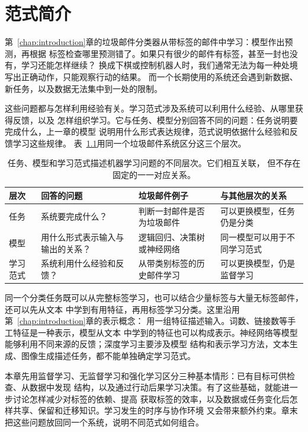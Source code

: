\chapter{范式简介}
\label{chap:machine-learning-paradigms}

第~\ref{chap:introduction}章的垃圾邮件分类器从带标签的邮件中学习：模型作出预测，再根据
标签检查哪里预测错了。如果只有很少的邮件有标签，甚至一封也没有，学习还能怎样继续？
换成下棋或控制机器人时，我们通常无法为每一种处境写出正确动作，只能观察行动的结果。
而一个长期使用的系统还会遇到新数据、新任务，以及数据无法集中到一处的限制。

这些问题都与怎样利用经验有关。学习范式涉及系统可以利用什么经验、从哪里获得反馈，以及
怎样组织学习。它与任务、模型分别回答不同的问题：任务说明要完成什么，上一章的模型
说明用什么形式表达规律，范式说明依据什么经验和反馈学习这些规律。
表~\ref{tab:task-paradigm-model}用同一个垃圾邮件系统区分这三个层次。

\begin{table}[htbp]
  \centering
  \small
  \begin{tabularx}{\linewidth}{@{}lXXX@{}}
    \toprule
    \textbf{层次} & \textbf{回答的问题} & \textbf{垃圾邮件例子} & \textbf{与其他层次的关系} \\
    \midrule
    任务 & 系统要完成什么？ & 判断一封邮件是否为垃圾邮件 & 可以更换模型，任务仍是分类 \\
    模型 & 用什么形式表示输入与输出的关系？ & 逻辑回归、决策树或神经网络 & 同一模型可以用于不同学习范式 \\
    学习范式 & 系统利用什么经验和反馈？ & 从带类别标签的历史邮件学习 & 可以更换模型，仍是监督学习 \\
    \bottomrule
  \end{tabularx}
  \caption{任务、模型和学习范式描述机器学习问题的不同层次。它们相互关联，
  但不存在固定的一一对应关系。}
  \label{tab:task-paradigm-model}
\end{table}
\FloatBarrier

同一个分类任务既可以从完整标签学习，也可以结合少量标签与大量无标签邮件，还可以先从文本
中学到有用特征，再用标签学习分类。这里沿用第~\ref{chap:introduction}章的表示概念：
用一组特征描述输入。词数、链接数等手工特征是一种表示，模型从文本
中学到的特征也可以构成表示。神经网络等模型能够利用不同来源的反馈；深度学习主要涉及模型
结构和表示学习方法，文本生成、图像生成描述任务，都不能单独确定学习范式。

本章先用监督学习、无监督学习和强化学习区分三种基本情形：已有目标可供检查、从数据中发现
结构，以及通过行动后果学习决策。有了这些基础，就能进一步讨论怎样减少对标签的依赖、提高
获取标签的效率，以及数据或任务变化后怎样共享、保留和迁移知识。学习发生的时序与协作环境
又会带来额外约束。章末把这些问题放回同一个系统，说明不同范式如何组合。

